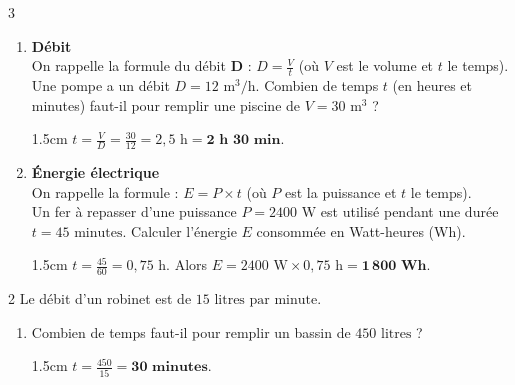 \documentclass[a4paper]{book}
\begin{document}
{\begin{exerciceNote}{3}
\begin{enumerate}[leftmargin=*]
            \begin{ZoneReponse}{1.5cm}           
            $m = \rho \times V = 7,8 \text{ g/cm}^3 \times 150 \text{ cm}^3 = \mathbf{1\,170 \text{ g}}$.
            \end{ZoneReponse}
            
            \item \textbf{Débit} \\
            On rappelle la formule du débit \textbf{D} : $D = \frac{V}{t}$ (où $V$ est le volume et $t$ le temps). \\
            Une pompe a un débit $D = 12 \text{ m}^3\text{/h}$. Combien de temps $t$ (en heures et minutes) faut-il pour remplir une piscine de $V = 30 \text{ m}^3$ ?

            \begin{ZoneReponse}{1.5cm}            
            $t = \frac{V}{D} = \frac{30}{12} = 2,5 \text{ h} = \mathbf{2 \text{ h } 30 \text{ min}}$.
            \end{ZoneReponse}

\newpage
            
            \item \textbf{Énergie électrique} \\
            On rappelle la formule : $E = P \times t$ (où $P$ est la puissance et $t$ le temps). \\
            Un fer à repasser d'une puissance $P = 2400 \text{ W}$ est utilisé pendant une durée $t = 45 \text{ minutes}$. 
            Calculer l'énergie $E$ consommée en Watt-heures (Wh).

            \begin{ZoneReponse}{1.5cm}          
            $t = \frac{45}{60} = 0,75 \text{ h}$. Alors $E = 2400 \text{ W} \times 0,75 \text{ h} = \mathbf{1\,800 \text{ Wh}}$.
            \end{ZoneReponse}
        \end{enumerate}
    \end{exerciceNote}

    \begin{exerciceNote}{2}
        Le débit d'un robinet est de $15 \text{ litres par minute}$.
        \begin{enumerate}[leftmargin=*]
            \item 
            Combien de temps faut-il pour remplir un bassin de $450 \text{ litres}$ ? 
            \begin{ZoneReponse}{1.5cm}          
            $t = \frac{450}{15} = \mathbf{30 \text{ minutes}}$.
            \end{ZoneReponse}


\end{enumerate}
\end{exerciceNote}}
\end{document}
